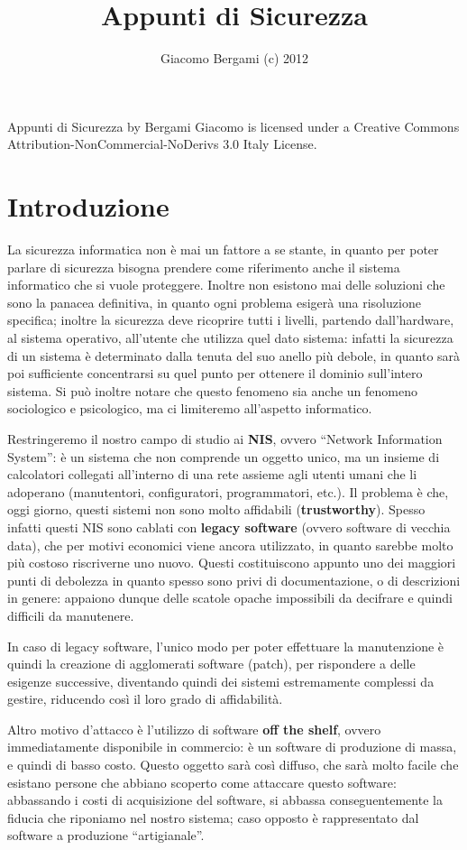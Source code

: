 
\title{Appunti di Sicurezza}
\author{Giacomo Bergami (c) 2012}
Appunti di Sicurezza by Bergami Giacomo is licensed under a Creative Commons Attribution-NonCommercial-NoDerivs 3.0 Italy License.
\pagebreak
\tableofcontents
\pagebreak


\chapter{Introduzione}
La sicurezza informatica non è mai un fattore a se stante, in quanto per
poter parlare di sicurezza bisogna prendere come riferimento anche il sistema
informatico che si vuole proteggere. Inoltre non esistono mai delle soluzioni
che sono la panacea definitiva, in quanto ogni problema esigerà una risoluzione
specifica; inoltre la sicurezza deve ricoprire tutti i livelli, partendo
dall'hardware, al sistema operativo, all'utente che utilizza quel dato sistema:
infatti la sicurezza di un sistema è determinato dalla tenuta del suo anello 
più debole, in quanto sarà poi sufficiente concentrarsi su quel punto
per ottenere il dominio sull'intero sistema. Si può inoltre notare che questo
fenomeno sia anche un fenomeno sociologico e psicologico, ma ci limiteremo
all'aspetto informatico.


Restringeremo il nostro campo di studio ai \textbf{NIS}, ovvero ``Network 
Information System'': è un sistema che non comprende un oggetto unico,
ma un insieme di calcolatori collegati all'interno di una rete assieme agli
utenti umani che li adoperano (manutentori, configuratori, programmatori, etc.).
Il problema è che, oggi giorno, questi sistemi non sono molto affidabili
(\textbf{trustworthy}). Spesso infatti questi NIS sono cablati con \textbf{legacy software}
(ovvero software di vecchia data), che per motivi economici viene ancora
utilizzato, in quanto sarebbe molto più costoso riscriverne uno nuovo.
Questi costituiscono appunto uno dei maggiori punti di debolezza in quanto
spesso sono privi di documentazione, o di descrizioni in genere: appaiono 
dunque delle scatole opache impossibili da decifrare e quindi difficili da
manutenere.


In caso di legacy software, l'unico modo per poter effettuare la manutenzione è quindi la creazione di
agglomerati software (patch), per rispondere a delle esigenze successive, 
diventando quindi dei sistemi estremamente complessi da gestire, riducendo
così il loro grado di affidabilità.


Altro motivo d'attacco è l'utilizzo di software \textbf{off the shelf}, ovvero
immediatamente disponibile in commercio: è un software di produzione di massa,
e quindi di basso costo. Questo oggetto sarà così diffuso, che sarà molto 
facile che esistano persone che abbiano scoperto come attaccare questo
software: abbassando i costi di acquisizione del software, si abbassa 
conseguentemente la fiducia che riponiamo nel nostro sistema; caso opposto è 
rappresentato dal software a produzione ``artigianale''.

